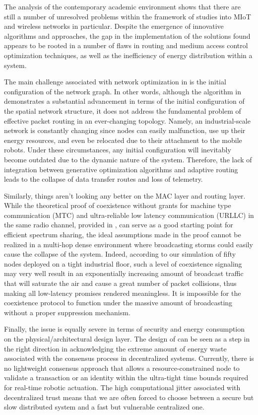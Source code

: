 \documentclass[a4paper,fleqn]{cas-dc}
\numberwithin{equation}{section}
\begin{document}
The analysis of the contemporary academic environment shows that there are still a number of unresolved problems within the framework of studies into MIoT and wireless networks in particular. Despite the emergence of innovative algorithms and approaches, the gap in the implementation of the solutions found appears to be rooted in a number of flaws in routing and medium access control optimization techniques, as well as the inefficiency of energy distribution within a system.

The main challenge associated with network optimization in \cite{b2} is the initial configuration of the network graph. In other words, although the algorithm in \cite{b2} demonstrates a substantial advancement in terms of the initial configuration of the spatial network structure, it does not address the fundamental problem of effective packet routing in an ever-changing topology. Namely, an industrial-scale network is constantly changing since nodes can easily malfunction, use up their energy resources, and even be relocated due to their attachment to the mobile robots. Under these circumstances, any initial configuration will inevitably become outdated due to the dynamic nature of the system. Therefore, the lack of integration between generative optimization algorithms and adaptive routing leads to the collapse of data transfer routes and loss of telemetry.

Similarly, things aren't looking any better on the MAC layer and routing layer. While the theoretical proof of coexistence without grants for machine type communication (MTC) and ultra-reliable low latency communication (URLLC) in the same radio channel, provided in \cite{b5}, can serve as a good starting point for efficient spectrum sharing, the ideal assumptions made in the proof cannot be realized in a multi-hop dense environment where broadcasting storms could easily cause the collapse of the system. Indeed, according to our simulation of fifty nodes deployed on a tight industrial floor, such a level of coexistence signaling may very well result in an exponentially increasing amount of broadcast traffic that will saturate the air and cause a great number of packet collisions, thus making all low-latency promises rendered meaningless. It is impossible for the coexistence protocol to function under the massive amount of broadcasting without a proper suppression mechanism.

Finally, the issue is equally severe in terms of security and energy consumption on the physical/architectural design layer. The design of \cite{b3} can be seen as a step in the right direction in acknowledging the extreme amount of energy waste associated with the consensus process in decentralized systems. Currently, there is no lightweight consensus approach that allows a resource-constrained node to validate a transaction or an identity within the ultra-tight time bounds required for real-time robotic actuation. The high computational jitter associated with decentralized trust means that we are often forced to choose between a secure but slow distributed system and a fast but vulnerable centralized one.
\end{document}
